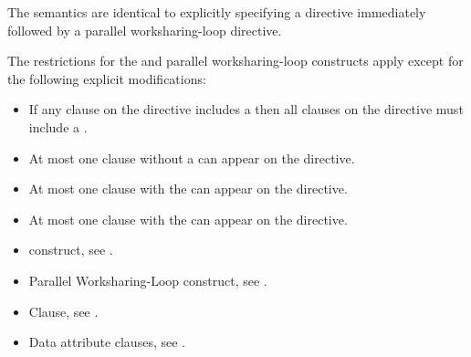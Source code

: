 \descr
The semantics are identical to explicitly specifying a  directive
immediately followed by a parallel worksharing-loop directive.


\restrictions
The restrictions for the  and parallel worksharing-loop constructs apply except for the following explicit modifications:

\begin{itemize}
\item If any  clause on the directive includes a
       then all  clauses
      on the directive must include a .

\item At most one  clause without a
       can appear on the directive.

\item At most one  clause with the 
       can appear on the directive.


\item At most one  clause with the 
       can appear on the directive.
\end{itemize}

\crossreferences
\begin{itemize}
\item {} construct, see
.

\item Parallel Worksharing-Loop construct, see
.

\item {} Clause, see .

\item Data attribute clauses, see
.

\end{itemize}










